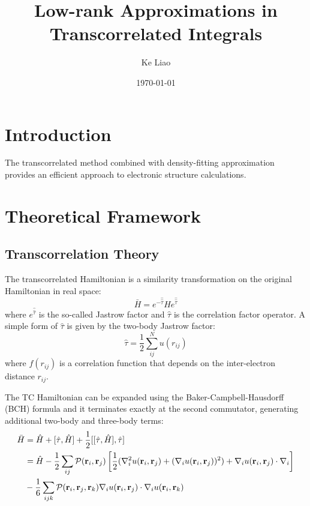 \documentclass[12pt]{article}
\title{Low-rank Approximations in Transcorrelated Integrals}
\author{Ke Liao}
\date{\today}
\begin{document}
\maketitle

\section{Introduction}
The transcorrelated method combined with density-fitting approximation provides an efficient approach to electronic structure calculations.

\section{Theoretical Framework}
\subsection{Transcorrelation Theory}
The transcorrelated Hamiltonian is a similarity transformation 
on the original Hamiltonian in real space:
\begin{equation}
    \bar{H} = e^{-\hat{\hat{\tau}}} H e^{\hat{\hat{\tau}}}
\end{equation}
where $e^{\hat{\hat{\tau}}}$ is the so-called Jastrow factor and 
$\hat{\tau}$ is the correlation factor operator. 
A simple form of $\hat{\tau}$ is given by the two-body Jastrow factor:
\begin{equation}
    \hat{\tau} = \frac{1}{2}\sum_{ij}^N  u(r_{ij})
\end{equation}
where $f(r_{ij})$ is a correlation function that depends on the inter-electron distance $r_{ij}$.

The TC Hamiltonian can be expanded using the Baker-Campbell-Hausdorff (BCH) formula and it terminates exactly
at the second commutator, generating additional two-body and three-body terms:
\begin{equation}
    \begin{aligned}
        \bar{H} &= \hat{H} + [\hat{\tau}, \hat{H}] + \frac{1}{2}[[\hat{\tau}, \hat{H}], \hat{\tau}]  \\
        &= \hat{H} - \frac{1}{2}\sum_{ij}\mathcal{P}({{\bf r}_i},{{\bf r}_j})\left[\frac{1}{2}(\nabla_i^2 u({\bf r}_i,{\bf r}_j) + (\nabla_i u({\bf r}_i,{\bf r}_j))^2) + \nabla_i u({\bf r}_i,{\bf r}_j)\cdot\nabla_i\right]\\
        & - \frac{1}{6}\sum_{ijk}\mathcal{P}({{\bf r}_i},{{\bf r}_j},{\bf r}_k)\nabla_i u({\bf r}_i,{\bf r}_j)\cdot\nabla_i u({\bf r}_i,{\bf r}_k)
    \end{aligned}
\end{equation}
\end{document}
